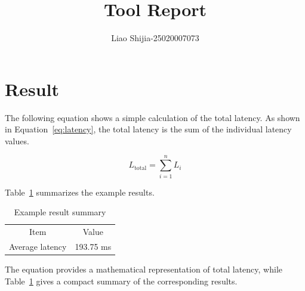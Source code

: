 \documentclass{article}
\begin{document}
\title{Tool Report}
\author{Liao Shijia-25020007073}
\maketitle

\section{Result}

The following equation shows a simple calculation of the total
latency. As shown in Equation~\eqref{eq:latency}, the total latency
is the sum of the individual latency values.

\begin{equation}
L_{\mathrm{total}} = \sum_{i=1}^{n} L_i
\label{eq:latency}
\end{equation}

Table~\ref{tab:result} summarizes the example results.

\begin{table}[htbp]
\centering
\caption{Example result summary}
\label{tab:result}
\begin{tabular}{cc}
\hline
Item & Value \\
Average latency & 193.75 ms \\
\hline
\end{tabular}
\end{table}

The equation provides a mathematical representation of total
latency, while Table~\ref{tab:result} gives a compact summary of the
corresponding results.
\end{document}
